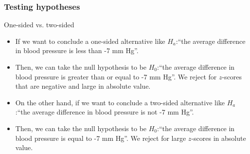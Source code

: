 \documentclass[handout]{beamer}
\begin{document}

   \begin{frame} \frametitle{Testing hypotheses}

   \begin{block}
   {One-sided vs. two-sided}
   \begin{itemize}

   \item If we want to conclude a one-sided alternative like
     $H_a$:``the average difference in blood pressure is less than -7 mm Hg''.
   \item Then, we can take the null hypothesis to be
   $H_0$:``the average difference in blood pressure is greater than or equal to -7 mm Hg''.
   We reject for $z$-scores that are negative and large
   in absolute value.

   \item On the other hand, if we want to conclude a two-sided
   alternative like $H_a$:``the average difference in blood pressure is
    not -7 mm Hg''.

   \item Then, we can take the null hypothesis to be
   $H_0$:``the average difference
   in blood pressure is equal to -7 mm Hg''. We reject for large $z$-scores
   in absolute value.


   \end{itemize}
   \end{block}
   \end{frame}

\end{document}
